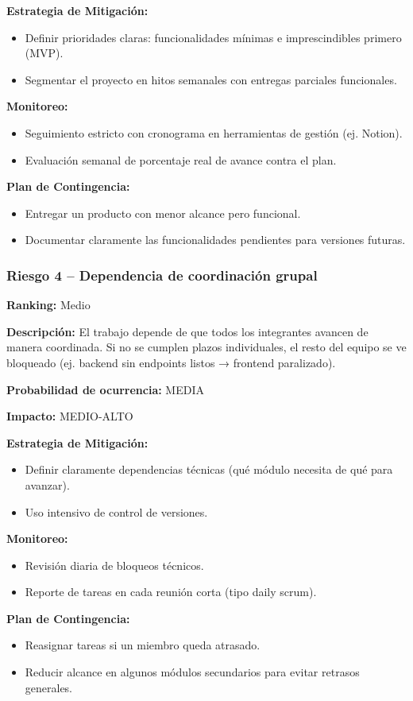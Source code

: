 \textbf{Estrategia de Mitigación:}
\begin{itemize}
    \item Definir prioridades claras: funcionalidades mínimas e imprescindibles primero (MVP).
    \item Segmentar el proyecto en hitos semanales con entregas parciales funcionales.
\end{itemize}

\textbf{Monitoreo:}
\begin{itemize}
    \item Seguimiento estricto con cronograma en herramientas de gestión (ej. Notion).
    \item Evaluación semanal de porcentaje real de avance contra el plan.
\end{itemize}

\textbf{Plan de Contingencia:}
\begin{itemize}
    \item Entregar un producto con menor alcance pero funcional.
    \item Documentar claramente las funcionalidades pendientes para versiones futuras.
\end{itemize}

\subsubsection{Riesgo 4 -- Dependencia de coordinación grupal}

\textbf{Ranking:} Medio

\textbf{Descripción:} El trabajo depende de que todos los integrantes avancen de manera coordinada. Si no se cumplen plazos individuales, el resto del equipo se ve bloqueado (ej. backend sin endpoints listos → frontend paralizado).

\textbf{Probabilidad de ocurrencia:} MEDIA

\textbf{Impacto:} MEDIO-ALTO

\textbf{Estrategia de Mitigación:}
\begin{itemize}
    \item Definir claramente dependencias técnicas (qué módulo necesita de qué para avanzar).
    \item Uso intensivo de control de versiones.
\end{itemize}

\textbf{Monitoreo:}
\begin{itemize}
    \item Revisión diaria de bloqueos técnicos.
    \item Reporte de tareas en cada reunión corta (tipo daily scrum).
\end{itemize}

\textbf{Plan de Contingencia:}
\begin{itemize}
    \item Reasignar tareas si un miembro queda atrasado.
    \item Reducir alcance en algunos módulos secundarios para evitar retrasos generales.
\end{itemize}